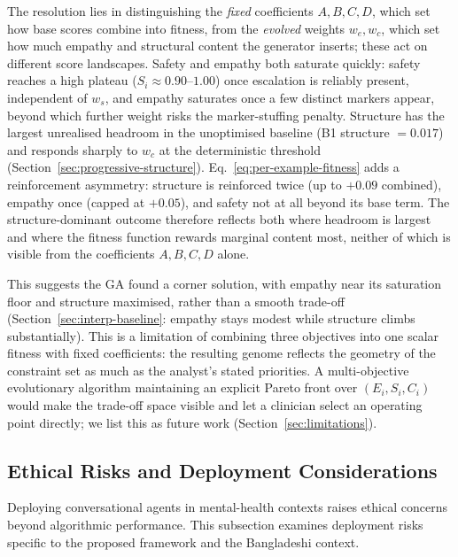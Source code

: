 \documentclass[mathematics,article,submit,xetex,moreauthors]{Definitions/mdpi}
\begin{document}
The resolution lies in distinguishing the \emph{fixed} coefficients
$A,B,C,D$, which set how base scores combine into fitness, from the
\emph{evolved} weights $w_e, w_c$, which set how much empathy and structural
content the generator inserts; these act on different score landscapes.
Safety and empathy both saturate quickly: safety reaches a high plateau
($S_i \approx 0.90$--$1.00$) once escalation is reliably present, independent
of $w_s$, and empathy saturates once a few distinct markers appear, beyond
which further weight risks the marker-stuffing penalty. Structure has the
largest unrealised headroom in the unoptimised baseline (B1 structure
$=0.017$) and responds sharply to $w_c$ at the deterministic threshold
(Section~\ref{sec:progressive-structure}). Eq.~\eqref{eq:per-example-fitness}
adds a reinforcement asymmetry: structure is reinforced twice (up to $+0.09$
combined), empathy once (capped at $+0.05$), and safety not at all beyond its
base term. The structure-dominant outcome therefore reflects both where
headroom is largest and where the fitness function rewards marginal content
most, neither of which is visible from the coefficients $A,B,C,D$ alone.

This suggests the GA found a corner solution, with empathy near its
saturation floor and structure maximised, rather than a smooth trade-off
(Section~\ref{sec:interp-baseline}: empathy stays modest while structure
climbs substantially). This is a limitation of combining three objectives into one scalar fitness with fixed coefficients:
the resulting genome reflects the geometry of the constraint set as much as
the analyst's stated priorities. A multi-objective evolutionary algorithm
maintaining an explicit Pareto front over $(E_i, S_i, C_i)$ would make the
trade-off space visible and let a clinician select an operating point
directly; we list this as future work (Section~\ref{sec:limitations}).



\subsection{Ethical Risks and Deployment Considerations}
\label{sec:ethics}

Deploying conversational agents in mental-health contexts raises ethical
concerns beyond algorithmic performance. This subsection examines deployment
risks specific to the proposed framework and the Bangladeshi context.
\end{document}
